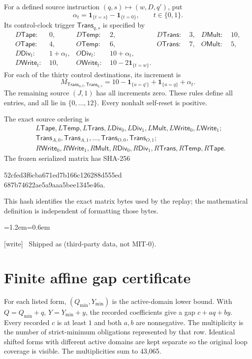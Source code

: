 \documentclass[11pt,letterpaper]{article}
\theoremstyle{definition}
\theoremstyle{remark}
\newcommand{\ind}[1]{\mathbf 1_{\{#1\}}}
\newcommand{\clk}[1]{\mathsf{#1}}
\newcommand{\wtag}{\textup{[write]}}
\newenvironment{writenote}{\par\smallskip\begin{list}{}{\leftmargin=1.2em\rightmargin=0.6em}\item[]\small\wtag\ }{\end{list}\smallskip}
\begin{document}
For a defined source instruction $(q,s)\mapsto(w,D,q')$, put
\[
 \alpha_t=\ind{t=s}-\ind{t=0},\qquad t\in\{0,1\}.
\]
Its control-clock trigger $\clk{Trans}_{q,s}$ is specified by
\begin{align*}
 D\clk{Tape}:&\ 0,& D\clk{Temp}:&\ 2,& D\clk{Trans}:&\ 3,&D\clk{Mult}:&\ 10,\\
 O\clk{Tape}:&\ 4,& O\clk{Temp}:&\ 6,& O\clk{Trans}:&\ 7,&O\clk{Mult}:&\ 5,\\
 D\clk{Div}_t:&\ 1+\alpha_t,&O\clk{Div}_t:&\ 10+\alpha_t,&&&&\\
 D\clk{Write}_t:&\ 10,&O\clk{Write}_t:&\ 10-2\ind{t=w}.&&&&
\end{align*}
For each of the thirty control destinations, its increment is
\begin{equation}\label{qoc:wf:eq:trans-entry}
 M_{\clk{Trans}_{u,t},\clk{Trans}_{q,s}}
   =10-\ind{u=q'}+\ind{u=q}+\alpha_t.
\end{equation}
The remaining source $(J,1)$ has all increments zero. These rules define all entries, and all lie in $\{0,\ldots,12\}$. Every nonhalt self-reset is positive.

The exact source ordering is
\begin{align*}
 &L\clk{Tape},L\clk{Temp},L\clk{Trans},L\clk{Div}_0,L\clk{Div}_1,
 L\clk{Mult},L\clk{Write}_0,L\clk{Write}_1;\\
 &\clk{Trans}_{A,0},\clk{Trans}_{A,1},\ldots,\clk{Trans}_{O,0},\clk{Trans}_{O,1};\\
 &R\clk{Write}_0,R\clk{Write}_1,R\clk{Mult},R\clk{Div}_0,R\clk{Div}_1,
 R\clk{Trans},R\clk{Temp},R\clk{Tape}.
\end{align*}
The frozen serialized matrix has SHA-256
\begin{center}\small\ttfamily
52cfed3f6cba671ed7b166c126288d555ed\\687b74622ae5a9aaa5bee1345e46a.
\end{center}
This hash identifies the exact matrix bytes used by the replay; the mathematical definition is independent of formatting those bytes.

\begin{writenote}
Shipped as  (third-party data, not MIT-0).
\end{writenote}

\section{Finite affine gap certificate}\label{qoc:wf:app:gaps}
For each listed form, $(Q_{\min},Y_{\min})$ is the active-domain lower bound. With $Q=Q_{\min}+q$, $Y=Y_{\min}+y$, the recorded coefficients give a gap $c+aq+by$. Every recorded $c$ is at least $1$ and both $a,b$ are nonnegative. The multiplicity is the number of strict-minimum obligations represented by that row. Identical shifted forms with different active domains are kept separate so the original loop coverage is visible. The multiplicities sum to 43,065.
\end{document}
